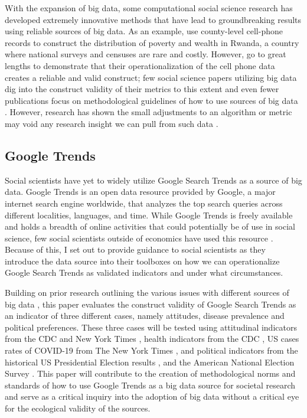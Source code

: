 With the expansion of big data, some computational social science research has
developed extremely innovative methods that have lead to groundbreaking results using 
reliable sources of big data. As an example,\citet{blumenstockPredictingPovertyWealth2015}
use county-level cell-phone records to construct the distribution of poverty
and wealth in Rwanda, a country where national surveys and censuses are
rare and costly. However, \citet{blumenstockPredictingPovertyWealth2015} go to
great lengths to demonstrate that their operationalization of the cell
phone data creates a reliable and valid construct; few social science
papers utilizing big data dig into the construct validity of their
metrics to this extent and even fewer publications focus on
methodological guidelines of how to use sources of big data
\citep[For exceptions, see ][]{asseoTrackingCOVID19Using2020, stilesAssessingCriterionValidity2018}.
However, research has shown the small adjustments to an algorithm or
metric may void any research insight we can pull from such data
\citep{lazerParableGoogleFlu2014}.

\subsection{Google Trends}

Social scientists have yet to widely utilize Google Search Trends as a source of big data.
Google Trends is an open data resource provided by Google, a major internet search
engine worldwide, that analyzes the top search queries across different localities, 
languages, and time. While Google Trends is freely available and holds a breadth of 
online activities that could potentially be of use in social science, few social 
scientists outside of economics have used this resource \citep[see][for examples]{choi2012predicting, jun2018ten,da2011search}. 
Because of this, I set out to provide guidance to social scientists as they introduce
the data source into their toolboxes on how we can operationalize Google Search Trends
as validated indicators and under what circumstances.

Building on prior research outlining the various issues with different sources of big data
\citep{boydCriticalQuestionsBig2012,lazerIssuesConstructValidity2015},
this paper evaluates the construct validity of Google Search Trends as an indicator of three different
cases, namely attitudes, disease prevalence and political preferences.
These three cases will be tested using attitudinal indicators from the %
CDC \citeyearpar{vaches_data} and New York Times \citeyearpar{mask_data}, 
health indicators from the CDC \citeyearpar{suic_data}, 
US cases rates of COVID-19 from The New York Times \citeyearpar{covid_data},  
and political indicators from the historical US Presidential Election results \citeyearpar{pres_data}, 
and the American National Election Survey \citeyearpar{anes_data}. This paper will contribute to the
creation of methodological norms and standards of how to use Google
Trends as a big data source for societal research and serve as a
critical inquiry into the adoption of big data without a critical eye
for the ecological validity of the sources.

